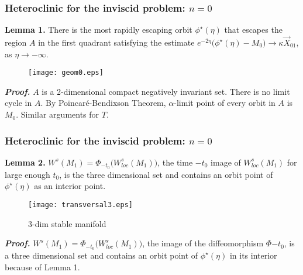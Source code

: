 \documentclass{beamer}
\begin{document}
\begin{frame}
 \frametitle{Heteroclinic for the inviscid problem: $n=0$}
 {\bf Lemma 1.} There is the most rapidly escaping orbit $\phi^\star(\eta)$ that escapes the region $A$ in the first quadrant satisfying the estimate
 $e^{-2\eta}\Big(\phi^\star(\eta)- M_0\Big) \rightarrow \kappa\vec{X}_{01}$, as $\eta \rightarrow -\infty$.
 \begin{figure}
  \centering
  \texttt{[image: geom0.eps]} \label{fig:flow0}  
%   
%   
 \end{figure}
 {\scriptsize
 {\bf \it Proof.}
  $A$ is a 2-dimensional compact negatively invariant set. There is no limit cycle in $A$. By Poincar\'e-Bendixson Theorem, $\alpha$-limit point of every orbit in $A$ is $M_0$. Similar arguments for $T$.
 }
\end{frame}

\begin{frame}
 \frametitle{Heteroclinic for the inviscid problem: $n=0$}
 {\bf Lemma 2.} $W^s(M_1) = \Phi_{-t_0}\big(W^s_{loc}(M_1)\big)$, the time $-t_0$ image of $W^s_{loc}(M_1)$ for large enough $t_0$, is the three dimensional set and contains an orbit point of $\phi^\star(\eta)$ as an interior point.
   \begin{figure}
  \centering
    \texttt{[image: transversal3.eps]}
    \caption{3-dim stable manifold}
 \end{figure}
 \vskip -15pt
 {\scriptsize
 {\bf \it Proof.}
  $W^s(M_1) = \Phi_{-t_0}\big(W^s_{loc}(M_1)\big)$, the image of the diffeomorphism $\Phi{-t_0}$, is a three dimensional set and contains an orbit point of $\phi^\star(\eta)$ in its interior because of Lemma 1.
 }
\end{frame}
\end{document}
